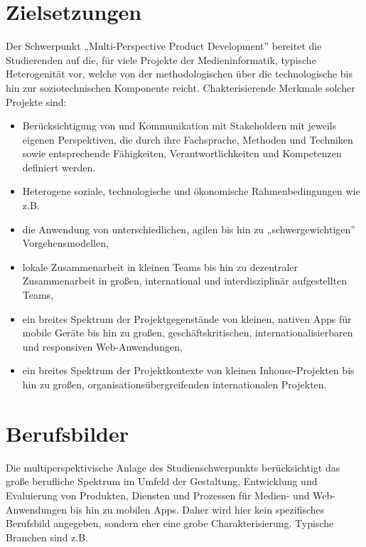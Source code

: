 \section*{Zielsetzungen\label{/mi-2017/modulbeschreibungen-master/schwerpunkt-multiperspective-product-development}}\label{zielsetzungenpathlabelmi-2017modulbeschreibungen-masterschwerpunkt-multiperspective-product-development}

Der Schwerpunkt „Multi-Perspective Product Development'' bereitet die
Studierenden auf die, für viele Projekte der Medieninformatik, typische
Heterogenität vor, welche von der methodologischen über die
technologische bis hin zur soziotechnischen Komponente reicht.
Chakterisierende Merkmale solcher Projekte sind:

\begin{itemize}
\tightlist
\item
  Berücksichtigung von und Kommunikation mit Stakeholdern mit jeweils
  eigenen Perspektiven, die durch ihre Fachsprache, Methoden und
  Techniken sowie entsprechende Fähigkeiten, Verantwortlichkeiten und
  Kompetenzen definiert werden.
\item
  Heterogene soziale, technologische und ökonomische Rahmenbedingungen
  wie z.B.
\item
  die Anwendung von unterschiedlichen, agilen bis hin zu
  „schwergewichtigen'' Vorgehensmodellen,
\item
  lokale Zusammenarbeit in kleinen Teams bis hin zu dezentraler
  Zusammenarbeit in großen, international und interdisziplinär
  aufgestellten Teams,
\item
  ein breites Spektrum der Projektgegenstände von kleinen, nativen Apps
  für mobile Geräte bis hin zu großen, geschäftskritischen,
  internationalisierbaren und responsiven Web-Anwendungen,
\item
  ein breites Spektrum der Projektkontexte von kleinen Inhouse-Projekten
  bis hin zu großen, organisationsübergreifenden internationalen
  Projekten.
\end{itemize}

\section*{Berufsbilder\label{/mi-2017/modulbeschreibungen-master/schwerpunkt-multiperspective-product-development}}\label{berufsbilderpathlabelmi-2017modulbeschreibungen-masterschwerpunkt-multiperspective-product-development}

Die multiperspektivische Anlage des Studienschwerpunkts berücksichtigt
das große berufliche Spektrum im Umfeld der Gestaltung, Entwicklung und
Evaluierung von Produkten, Diensten und Prozessen für Medien- und
Web-Anwendungen bis hin zu mobilen Apps. Daher wird hier kein
spezifisches Berufsbild angegeben, sondern eher eine grobe
Charakterisierung. Typische Branchen sind z.B.

